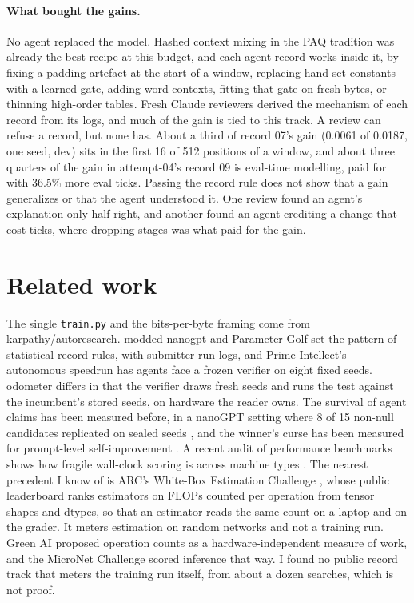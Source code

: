 \documentclass[11pt]{article}
\begin{document}
\paragraph{What bought the gains.} No agent replaced the model. Hashed context mixing in the PAQ tradition \cite{paq} was already the best recipe at this budget, and each agent record works inside it, by fixing a padding artefact at the start of a window, replacing hand-set constants with a learned gate, adding word contexts, fitting that gate on fresh bytes, or thinning high-order tables. Fresh Claude reviewers derived the mechanism of each record from its logs, and much of the gain is tied to this track. A review can refuse a record, but none has. About a third of record 07's gain (0.0061 of 0.0187, one seed, dev) sits in the first 16 of 512 positions of a window, and about three quarters of the gain in attempt-04's record 09 is eval-time modelling, paid for with 36.5\% more eval ticks. Passing the record rule does not show that a gain generalizes or that the agent understood it. One review found an agent's explanation only half right, and another found an agent crediting a change that cost ticks, where dropping stages was what paid for the gain.

\section{Related work}
The single \texttt{train.py} and the bits-per-byte framing come from karpathy/autoresearch. modded-nanogpt and Parameter Golf set the pattern of statistical record rules, with submitter-run logs, and Prime Intellect's autonomous speedrun has agents face a frozen verifier on eight fixed seeds. odometer differs in that the verifier draws fresh seeds and runs the test against the incumbent's stored seeds, on hardware the reader owns. The survival of agent claims has been measured before, in a nanoGPT setting where 8 of 15 non-null candidates replicated on sealed seeds \cite{lucky}, and the winner's curse has been measured for prompt-level self-improvement \cite{curse}. A recent audit of performance benchmarks shows how fragile wall-clock scoring is across machine types \cite{perfaudit}. The nearest precedent I know of is ARC's White-Box Estimation Challenge \cite{arc}, whose public leaderboard ranks estimators on FLOPs counted per operation from tensor shapes and dtypes, so that an estimator reads the same count on a laptop and on the grader. It meters estimation on random networks and not a training run. Green AI \cite{greenai} proposed operation counts as a hardware-independent measure of work, and the MicroNet Challenge \cite{micronet} scored inference that way. I found no public record track that meters the training run itself, from about a dozen searches, which is not proof.
\end{document}
